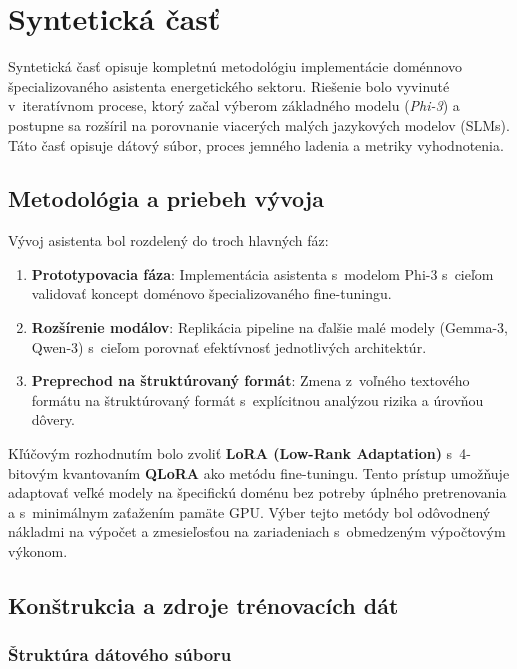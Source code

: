 
\chapter{Syntetická časť}\label{ch:synthetic}

Syntetická časť opisuje kompletnú metodológiu implementácie doménnovo špecializovaného asistenta energetického sektoru. Riešenie bolo vyvinuté v~iteratívnom procese, ktorý začal výberom základného modelu (\emph{Phi-3}) a postupne sa rozšíril na porovnanie viacerých malých jazykových modelov (SLMs). Táto časť opisuje dátový súbor, proces jemného ladenia a metriky vyhodnotenia.


\section{Metodológia a priebeh vývoja}

Vývoj asistenta bol rozdelený do troch hlavných fáz:
\begin{enumerate}
    \item \textbf{Prototypovacia fáza}: Implementácia asistenta s~modelom Phi-3 s~cieľom validovať koncept doménovo špecializovaného fine-tuningu.
    \item \textbf{Rozšírenie modálov}: Replikácia pipeline na ďalšie malé modely (Gemma-3, Qwen-3) s~cieľom porovnať efektívnosť jednotlivých architektúr.
    \item \textbf{Preprechod na štruktúrovaný formát}: Zmena z~voľného textového formátu na štruktúrovaný formát s~explícitnou analýzou rizika a úrovňou dôvery.
\end{enumerate}

Kľúčovým rozhodnutím bolo zvoliť \textbf{LoRA (Low-Rank Adaptation)} s~4-bitovým kvantovaním \textbf{QLoRA} ako metódu fine-tuningu. Tento prístup umožňuje adaptovať veľké modely na špecifickú doménu bez potreby úplného pretrenovania a s~minimálnym zaťažením pamäte GPU. Výber tejto metódy bol odôvodnený nákladmi na výpočet a zmesieľosťou na zariadeniach s~obmedzeným výpočtovým výkonom.


\section{Konštrukcia a zdroje trénovacích dát}\label{sec:dataset}

\subsection{Štruktúra dátového súboru}

